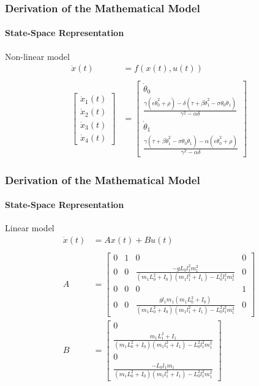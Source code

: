 \documentclass[]{beamer}
\begin{document}
\begin{frame}
	\frametitle{Derivation of the Mathematical Model}
	\framesubtitle{State-Space Representation}
	Non-linear model
	\begin{subequations}
	\begin{align*}
	\dot{x}(t) \; \, \, &= f(x(t),u(t))\\ \\
	\begin{bmatrix}
	\dot{x}_1(t) \\ \dot{x}_2(t) \\ \dot{x}_3(t) \\ \dot{x}_4(t)
	\end{bmatrix} &= \begin{bmatrix}
	\dot{\theta}_0\\
	\frac{\gamma(\epsilon\dot{\theta}_0^2+\rho)-\delta(\tau+\beta\dot{\theta}_1^2-\sigma\dot{\theta}_0\dot{\theta}_1)}{\gamma^2-\alpha\delta}\\
	\dot{\theta}_1\\
	\frac{\gamma(\tau+\beta\dot{\theta}_1^2-\sigma\dot{\theta}_0\dot{\theta}_1)-\alpha(\epsilon\dot{\theta}_0^2+\rho)}{\gamma^2-\alpha\delta}
	\end{bmatrix}
	\end{align*}
	\end{subequations}
\end{frame}
\begin{frame}
	\frametitle{Derivation of the Mathematical Model}
	\framesubtitle{State-Space Representation}
	Linear model
	\begin{subequations}
		\begin{align*}
		\dot{x}(t) &= Ax(t) + Bu(t)\\
		\\
		A\ \ &=\begin{bmatrix}0&1&0&0\\
		0&0&\frac{-gL_0l_1^2m_1^2}{(m_1L_0^2+I_0)(m_1l_1^2+I_1)-L_0^2l_1^2m_1^2}&0\\
		0&0&0&1\\
		0&0&\frac{gl_1m_1(m_1L_0^2+I_0)}{(m_1L_0^2+I_0)(m_1l_1^2+I_1)-L_0^2l_1^2m_1^2}&0
		\end{bmatrix}\\
		B\ \  &=	\begin{bmatrix}
		0\\ 
		\frac{m_1L_1^2+I_1}{(m_1L_0^2+I_0)(m_1l_1^2+I_1)-L_0^2l_1^2m_1^2}\\
		0\\
		\frac{-L_0l_1m_1}{(m_1L_0^2+I_0)(m_1l_1^2+I_1)-L_0^2l_1^2m_1^2}
		\end{bmatrix}
		\end{align*}
	\end{subequations}
\end{frame}
\end{document}
